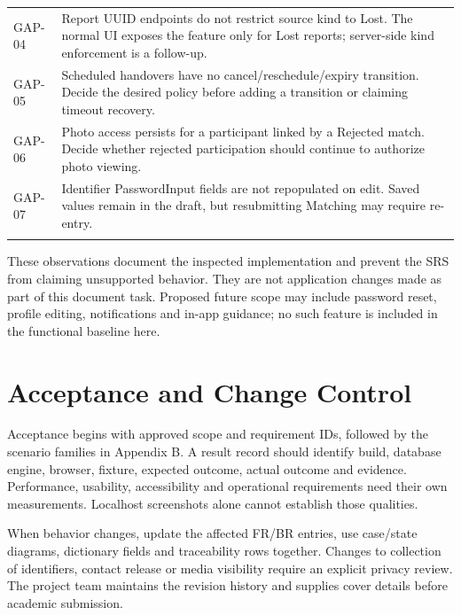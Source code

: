 \documentclass[12pt,a4paper,oneside]{report}
\begin{document}
\begin{longtable}{@{}P{0.15\dimexpr\textwidth-12pt\relax}P{0.85\dimexpr\textwidth-12pt\relax}@{}}
GAP-04 & Report UUID endpoints do not restrict source kind to Lost. The normal UI exposes the feature only for Lost reports; server-side kind enforcement is a follow-up. \\ \addlinespace[3pt]

GAP-05 & Scheduled handovers have no cancel/reschedule/expiry transition. Decide the desired policy before adding a transition or claiming timeout recovery. \\ \addlinespace[3pt]

GAP-06 & Photo access persists for a participant linked by a Rejected match. Decide whether rejected participation should continue to authorize photo viewing. \\ \addlinespace[3pt]

GAP-07 & Identifier PasswordInput fields are not repopulated on edit. Saved values remain in the draft, but resubmitting Matching may require re-entry. \\ \addlinespace[3pt]

\end{longtable}

These observations document the inspected implementation and prevent the SRS from claiming unsupported behavior. They are not application changes made as part of this document task. Proposed future scope may include password reset, profile editing, notifications and in-app guidance; no such feature is included in the functional baseline here.


\section{Acceptance and Change Control}

Acceptance begins with approved scope and requirement IDs, followed by the scenario families in Appendix B. A result record should identify build, database engine, browser, fixture, expected outcome, actual outcome and evidence. Performance, usability, accessibility and operational requirements need their own measurements. Localhost screenshots alone cannot establish those qualities.

When behavior changes, update the affected FR/BR entries, use case/state diagrams, dictionary fields and traceability rows together. Changes to collection of identifiers, contact release or media visibility require an explicit privacy review. The project team maintains the revision history and supplies cover details before academic submission.
\end{document}
